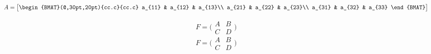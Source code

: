 \documentclass{book}
\begin{document}
\begin{equation}  
	A= 
	\begin{bmatrix}
		\begin{BMAT}(@,30pt,20pt){cc.c}{cc.c}
		a_{11} & a_{12} & a_{13}\\
		a_{21} & a_{22} & a_{23}\\
		a_{31} & a_{32} & a_{33}
		\end{BMAT}	
	\end{bmatrix}
\end{equation}

$$
F=
\big(
	\begin{matrix}
		A & B \\
		C & D
	\end{matrix}
)
$$
$$
F=
\big(
	\begin{smallmatrix}
		A & B \\
		C & D
	\end{smallmatrix}
)
$$
\end{document}
